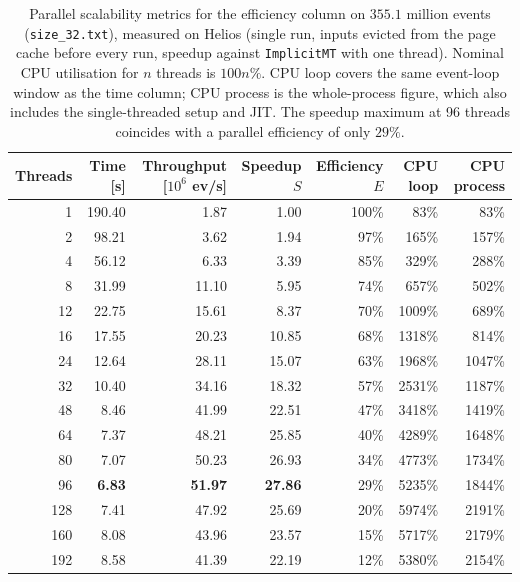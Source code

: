 \begin{table}[htbp]
\centering
\caption{Parallel scalability metrics for the efficiency column on $355.1$ million events (\texttt{size\_32.txt}), measured on Helios (single run, inputs evicted from the page cache before every run, speedup against \texttt{ImplicitMT} with one thread). Nominal CPU utilisation for $n$ threads is $100n\%$. CPU loop covers the same event-loop window as the time column; CPU process is the whole-process figure, which also includes the single-threaded setup and JIT. The speedup maximum at 96 threads coincides with a parallel efficiency of only $29\%$.}
\label{tab:scalability-efficiency}
\begin{tabular}{rrrrrrr}
\toprule
Threads & Time [s] & Throughput [$10^6$ ev/s] & Speedup $S$ & Efficiency $E$ & CPU loop & CPU process \\
\midrule
 1 & 190.40 & 1.87 & 1.00 & 100\% & 83\% & 83\% \\
 2 & 98.21 & 3.62 & 1.94 & 97\% & 165\% & 157\% \\
 4 & 56.12 & 6.33 & 3.39 & 85\% & 329\% & 288\% \\
 8 & 31.99 & 11.10 & 5.95 & 74\% & 657\% & 502\% \\
12 & 22.75 & 15.61 & 8.37 & 70\% & 1009\% & 689\% \\
16 & 17.55 & 20.23 & 10.85 & 68\% & 1318\% & 814\% \\
24 & 12.64 & 28.11 & 15.07 & 63\% & 1968\% & 1047\% \\
32 & 10.40 & 34.16 & 18.32 & 57\% & 2531\% & 1187\% \\
48 & 8.46 & 41.99 & 22.51 & 47\% & 3418\% & 1419\% \\
64 & 7.37 & 48.21 & 25.85 & 40\% & 4289\% & 1648\% \\
80 & 7.07 & 50.23 & 26.93 & 34\% & 4773\% & 1734\% \\
96 & \textbf{6.83} & \textbf{51.97} & \textbf{27.86} & 29\% & 5235\% & 1844\% \\
128 & 7.41 & 47.92 & 25.69 & 20\% & 5974\% & 2191\% \\
160 & 8.08 & 43.96 & 23.57 & 15\% & 5717\% & 2179\% \\
192 & 8.58 & 41.39 & 22.19 & 12\% & 5380\% & 2154\% \\
\bottomrule
\end{tabular}
\end{table}
